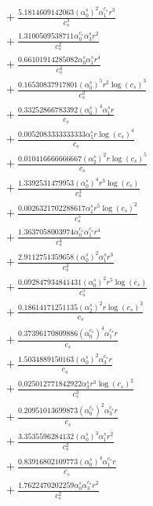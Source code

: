 \documentclass[10pt]{article}
\begin{document}
\begin{align*}
&{}  + \frac{5.1814609142063 \left(\alpha_{0}^s\right)^{2} \alpha_{1}^{c_s} r^{3}}{c_{s}^{3}} \\
&{}  + \frac{1.3100509538711 \alpha_{0}^{c_s} \alpha_{3}^s r^{2}}{c_{s}^{2}} \\
&{}  + \frac{0.66101914285082 \alpha_{0}^s \alpha_{1}^s r^{4}}{c_{s}^{4}} \\
&{}  + \frac{0.16530837917801 \left(\alpha_{0}^s\right)^{5} r^{2} \log{\left(c_{s} \right)}^{3}}{c_{s}^{2}} \\
&{}  + \frac{0.33252866783392 \left(\alpha_{0}^s\right)^{4} \alpha_{1}^s r}{c_{s}} \\
&{}  + \frac{0.0052083333333333 \alpha_{5}^s r \log{\left(c_{s} \right)}^{4}}{c_{s}} \\
&{}  + \frac{0.010416666666667 \left(\alpha_{2}^s\right)^{2} r \log{\left(c_{s} \right)}^{5}}{c_{s}} \\
&{}  + \frac{1.3392531479953 \left(\alpha_{0}^s\right)^{4} r^{3} \log{\left(c_{s} \right)}}{c_{s}^{3}} \\
&{}  + \frac{0.0026321702288617 \alpha_{1}^s r^{5} \log{\left(c_{s} \right)}^{2}}{c_{s}^{5}} \\
&{}  + \frac{1.3637058003974 \alpha_{0}^{c_s} \alpha_{1}^{c_s} r^{4}}{c_{s}^{4}} \\
&{}  + \frac{2.9112751359658 \left(\alpha_{0}^s\right)^{2} \alpha_{1}^s r^{3}}{c_{s}^{3}} \\
&{}  + \frac{0.092847934841431 \left(\alpha_{0}^s\right)^{2} r^{5} \log{\left(c_{s} \right)}}{c_{s}^{5}} \\
&{}  + \frac{0.18614171251135 \left(\alpha_{2}^s\right)^{2} r \log{\left(c_{s} \right)}^{3}}{c_{s}} \\
&{}  + \frac{0.37396170809886 \left(\alpha_{0}^{c_s}\right)^{4} \alpha_{1}^{c_s} r}{c_{s}} \\
&{}  + \frac{1.5034889150163 \left(\alpha_{0}^s\right)^{2} \alpha_{3}^{c_s} r}{c_{s}} \\
&{}  + \frac{0.025012771842922 \alpha_{3}^s r^{3} \log{\left(c_{s} \right)}^{2}}{c_{s}^{3}} \\
&{}  + \frac{0.20951013699873 \left(\alpha_{0}^{c_s}\right)^{2} \alpha_{3}^{c_s} r}{c_{s}} \\
&{}  + \frac{3.3535596284132 \left(\alpha_{0}^s\right)^{3} \alpha_{1}^s r^{2}}{c_{s}^{2}} \\
&{}  + \frac{0.83916802109773 \left(\alpha_{0}^s\right)^{4} \alpha_{1}^{c_s} r}{c_{s}} \\
&{}  + \frac{1.7622470202259 \alpha_{0}^s \alpha_{3}^{c_s} r^{2}}{c_{s}^{2}} \\

\end{align*}
\end{document}

